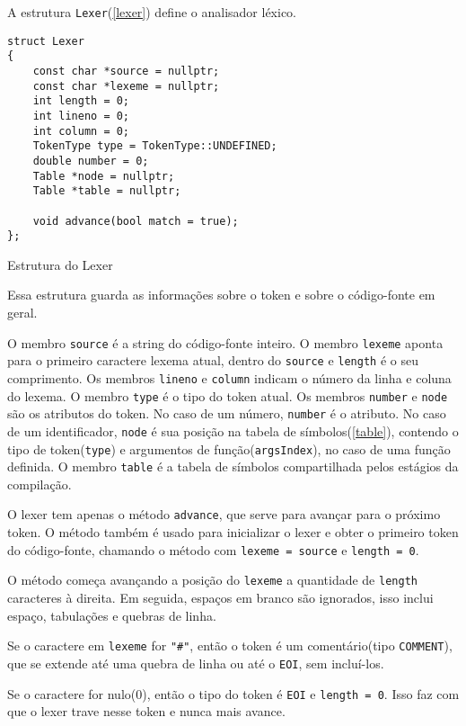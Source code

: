 \documentclass[10pt,a4paper]{article}
\newenvironment{code}{\captionsetup{type=listing}}{}
\begin{document}
A estrutura \texttt{Lexer}(\ref{lexer}) define o analisador léxico.
\begin{code}
\begin{verbatim}
struct Lexer
{
    const char *source = nullptr;
    const char *lexeme = nullptr;
    int length = 0;
    int lineno = 0;
    int column = 0;
    TokenType type = TokenType::UNDEFINED;
    double number = 0;
    Table *node = nullptr;
    Table *table = nullptr;

    void advance(bool match = true);
};
\end{verbatim}
\caption{Estrutura do Lexer}
\label{lexer}
\end{code}

Essa estrutura guarda as informações sobre o token e sobre o código-fonte em geral.

O membro \texttt{source} é a string do código-fonte inteiro.
O membro \texttt{lexeme} aponta para o primeiro caractere lexema atual,
dentro do \texttt{source} e \texttt{length} é o seu comprimento.
Os membros \texttt{lineno} e \texttt{column} indicam o número da linha e coluna do lexema.
O membro \texttt{type} é o tipo do token atual.
Os membros \texttt{number} e \texttt{node} são os atributos do token.
No caso de um número, \texttt{number} é o atributo.
No caso de um identificador, \texttt{node} é sua posição na tabela de símbolos(\ref{table}), 
contendo o tipo de token(\texttt{type}) e argumentos de função(\texttt{argsIndex}), no caso de uma função definida.
O membro \texttt{table} é a tabela de símbolos compartilhada pelos estágios da compilação.

O lexer tem apenas o método \texttt{advance}, que serve para avançar para o próximo token.
O método também é usado para inicializar o lexer e obter o primeiro token do código-fonte,
chamando o método com \texttt{lexeme = source} e \texttt{length = 0}.

O método começa avançando a posição do \texttt{lexeme} a quantidade de \texttt{length} caracteres à direita.
Em seguida, espaços em branco são ignorados, isso inclui espaço, tabulações e quebras de linha.

Se o caractere em \texttt{lexeme} for \texttt{"\#"}, então o token é um comentário(tipo \texttt{COMMENT}),
que se extende até uma quebra de linha ou até o \texttt{EOI}, sem incluí-los.

Se o caractere for nulo(0), então o tipo do token é \texttt{EOI} e \texttt{length = 0}.
Isso faz com que o lexer trave nesse token e nunca mais avance.
\end{document}
